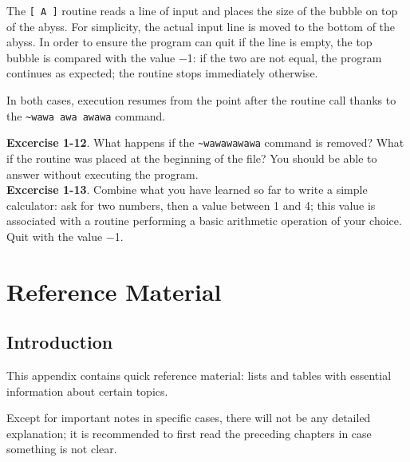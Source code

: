 \documentclass[11pt,a4paper,draft]{book}
\begin{document}
The \verb|[ A ]| routine reads a line of input and places the size of
the bubble on top of the abyss. For simplicity, the actual input line
is moved to the bottom of the abyss.  In order to ensure the program
can quit if the line is empty, the top bubble is compared with the
value \num{-1}: if the two are not equal, the program continues as
expected; the routine stops immediately otherwise.

In both cases, execution resumes from the point after the routine call
thanks to the \verb|~wawa awa awawa| command.

\textbf{Excercise 1-12}. What happens if the \verb|~wawawawawa|
command is removed? What if the routine was placed at the beginning of
the file? You should be able to answer without executing the
program. \\
\textbf{Excercise 1-13}. Combine what you have learned so far to write
a simple calculator: ask for two numbers, then a value between \num{1}
and \num{4}; this value is associated with a routine performing a
basic arithmetic operation of your choice. Quit with the value \num{-1}.

\appendix
\chapter{Reference Material}
\section{Introduction}
This appendix contains quick reference material: lists and tables with
essential information about certain topics.

Except for important notes in specific cases, there will not be any
detailed explanation; it is recommended to first read the preceding
chapters in case something is not clear.
\end{document}
